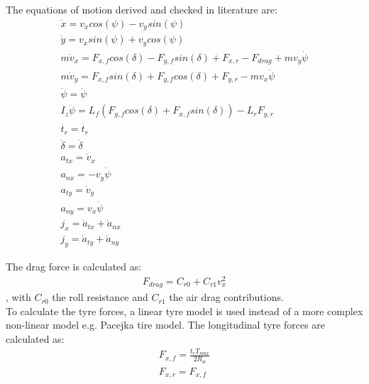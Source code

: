 The equations of motion derived and checked in literature \cite{TongDuySon2019} are:
\begin{equation}\label{eq:bicycle_model_eqmotion}
\begin{aligned}
\dot{x} = v_x cos(\psi) - v_y sin(\psi)\\
\dot{y} = v_x sin(\psi) + v_y cos(\psi)\\
m \dot{v}_x = F_{x,f} cos(\delta) - F_{y,f} sin(\delta) + F_{x,r} - F_{drag} + m v_y \dot{\psi}\\
m \dot{v}_y = F_{x,f} sin(\delta) + F_{y,f} cos(\delta) + F_{y,r} - m v_x \dot{\psi}\\
\dot{\psi} = \dot{\psi}\\
I_z \ddot{\psi} = L_f (F_{y,f} cos(\delta) + F_{x,f} sin(\delta)) - L_r F_{y,r}\\
\dot{t_r} = \dot{t_r}\\
\dot{\delta} = \dot{\delta}\\
a_{tx} = \dot{v}_x\\
a_{nx} = -v_y\dot{\psi}\\
a_{ty} = \dot{v}_y\\
a_{ny} = v_x\dot{\psi}\\
j_x = \dot{a}_{tx} + \dot{a}_{nx}\\
j_y = \dot{a}_{ty} + \dot{a}_{ny}
\end{aligned}
\end{equation}

The drag force is calculated as:
\begin{equation}\label{eq:bicycle_Fdrag}
\begin{aligned}
F_{drag} = C_{r0} + C_{r1} v_x^2
\end{aligned}
\end{equation},
with $C_{r0}$ the roll resistance and $C_{r1}$ the air drag contributions.\\

To calculate the tyre forces, a linear tyre model is used instead of a more complex non-linear model e.g. Pacejka tire model. The longitudinal tyre forces are calculated as:
\begin{equation}\label{eq:bicycle_Fx}
\begin{aligned}
F_{x,f} = \frac{t_r T_{max}}{2 R_w}\\
F_{x,r} = F_{x, f}
\end{aligned}
\end{equation}

